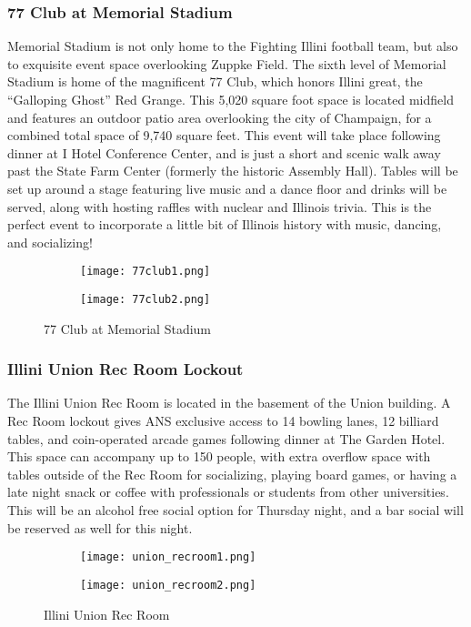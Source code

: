\subsubsection{77 Club at Memorial Stadium}
Memorial Stadium is not only home to the Fighting Illini football team, but also to exquisite event space overlooking Zuppke Field. The sixth level of Memorial Stadium is home of the magnificent 77 Club, which honors Illini great, the ``Galloping Ghost'' Red Grange. This 5,020 square foot space is located midfield and features an outdoor patio area overlooking the city of Champaign, for a combined total space of 9,740 square feet. This event will take place following dinner at I Hotel Conference Center, and is just a short and scenic walk away past the State Farm Center (formerly the historic Assembly Hall). Tables will be set up around a stage featuring live music and a dance floor and drinks will be served, along with hosting raffles with nuclear and Illinois trivia. This is the perfect event to incorporate a little bit of Illinois history with music, dancing, and socializing! 
\vspace{0.5cm}\newline
\begin{figure}[H]

	\centering
	\begin{subfigure}{0.5\textwidth}
		\centering
		\texttt{[image: 77club1.png]}
	\end{subfigure}%
	\begin{subfigure}{0.5\textwidth}
		\centering
		\texttt{[image: 77club2.png]}
	\end{subfigure}
	\caption{77 Club at Memorial Stadium}		
\end{figure} 

\subsubsection{Illini Union Rec Room Lockout}
The Illini Union Rec Room is located in the basement of the Union building. A Rec Room lockout gives ANS exclusive access to 14 bowling lanes, 12 billiard tables, and coin-operated arcade games following dinner at The Garden Hotel. This space can accompany up to 150 people, with extra overflow space with tables outside of the Rec Room for socializing, playing board games, or having a late night snack or coffee with professionals or students from other universities. This will be an alcohol free social option for Thursday night, and a bar social will be reserved as well for this night.
\vspace{0.5cm}\newline
\begin{figure}[H]
	\centering
	\begin{subfigure}{0.5\textwidth}
		\centering
		\texttt{[image: union\_recroom1.png]}
	\end{subfigure}%
	\begin{subfigure}{0.5\textwidth}
		\centering
		\texttt{[image: union\_recroom2.png]}
	\end{subfigure}	
	\caption{Illini Union Rec Room}	
\end{figure}

